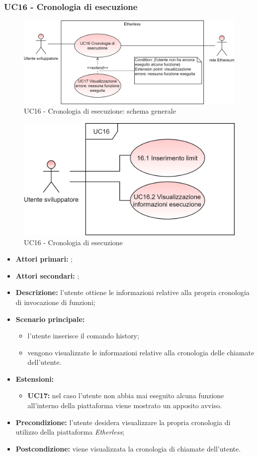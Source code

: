 \subsubsection{UC16 - Cronologia di esecuzione}
\begin{figure}[H]
	\centering
	\includegraphics[scale=\ucs]{./res/img/UC16G.png}
	\caption {UC16 - Cronologia di esecuzione: schema generale}
\end{figure}
\begin{figure}[H]
	\centering
	\includegraphics[scale=\ucs]{./res/img/UC16.png}
	\caption {UC16 - Cronologia di esecuzione}
\end{figure}
\begin{itemize}
	\item \textbf{Attori primari:} \us{};
	\item \textbf{Attori secondari:} \re{};
	\item \textbf{Descrizione:} l’utente ottiene le informazioni relative alla propria cronologia di invocazione di funzioni;
	\item \textbf{Scenario principale:} 
	\begin{itemize}
		\item l'utente inserisce il comando history;  
		\item vengono visualizzate le informazioni relative alla cronologia delle chiamate dell’utente.
	\end{itemize}
	\item \textbf{Estensioni:} 
	\begin{itemize}
		\item \textbf{UC17:} nel caso l’utente non abbia mai eseguito alcuna funzione all’interno della piattaforma viene mostrato un apposito avviso.  
	\end{itemize}
	\item \textbf{Precondizione:} l’utente desidera visualizzare la propria cronologia di utilizzo della piattaforma \textit{Etherless}; 
	\item \textbf{Postcondizione:} viene visualizzata la cronologia di chiamate dell’utente.  
\end{itemize}